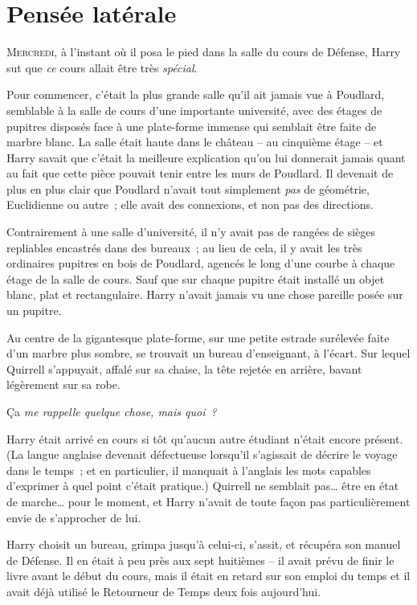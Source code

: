 \chapter{Pensée latérale}

\lettrine{M}{ercredi,} à l'instant où il posa le pied dans la salle du cours de Défense, Harry sut que \emph{ce} cours allait être très \emph{spécial}.

Pour commencer, c'était la plus grande salle qu'il ait jamais vue à Poudlard, semblable à la salle de cours d'une importante université, avec des étages de pupitres disposés face à une plate-forme immense qui semblait être faite de marbre blanc. La salle était haute dans le château -- au cinquième étage -- et Harry savait que c'était la meilleure explication qu'on lui donnerait jamais quant au fait que cette pièce pouvait tenir entre les murs de Poudlard. Il devenait de plus en plus clair que Poudlard n'avait tout simplement \emph{pas} de géométrie, Euclidienne ou autre~; elle avait des connexions, et non pas des directions.

Contrairement à une salle d'université, il n'y avait pas de rangées de sièges repliables encastrés dans des bureaux~; au lieu de cela, il y avait les très ordinaires pupitres en bois de Poudlard, agencés le long d'une courbe à chaque étage de la salle de cours. Sauf que sur chaque pupitre était installé un objet blanc, plat et rectangulaire. Harry n'avait jamais vu une chose pareille posée sur un pupitre.

Au centre de la gigantesque plate-forme, sur une petite estrade surélevée faite d'un marbre plus sombre, se trouvait un bureau d'enseignant, à l'écart. Sur lequel Quirrell s'appuyait, affalé sur sa chaise, la tête rejetée en arrière, bavant légèrement sur sa robe.

Ça \emph{me rappelle quelque chose, mais quoi~?}

Harry était arrivé en cours si tôt qu'aucun autre étudiant n'était encore présent. (La langue anglaise devenait défectueuse lorsqu'il s'agissait de décrire le voyage dans le temps~; et en particulier, il manquait à l'anglais les mots capables d'exprimer à quel point c'était pratique.) Quirrell ne semblait pas… être en état de marche… pour le moment, et Harry n'avait de toute façon pas particulièrement envie de s'approcher de lui.

Harry choisit un bureau, grimpa jusqu'à celui-ci, s'assit, et récupéra son manuel de Défense. Il en était à peu près aux sept huitièmes -- il avait prévu de finir le livre avant le début du cours, mais il était en retard sur son emploi du temps et il avait déjà utilisé le Retourneur de Temps deux fois aujourd'hui.


